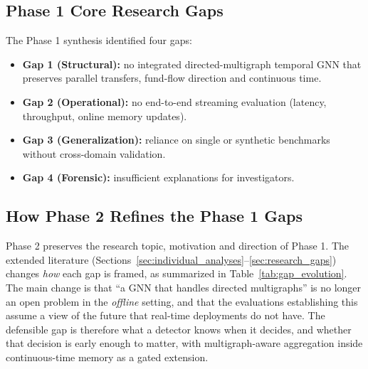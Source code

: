 \documentclass[11pt,a4paper]{article}
\begin{document}
\subsection{Phase 1 Core Research Gaps}
The Phase 1 synthesis identified four gaps:
\begin{itemize}[leftmargin=*]
    \item \textbf{Gap 1 (Structural):} no integrated directed-multigraph temporal GNN that preserves parallel transfers, fund-flow direction and continuous time.
    \item \textbf{Gap 2 (Operational):} no end-to-end streaming evaluation (latency, throughput, online memory updates).
    \item \textbf{Gap 3 (Generalization):} reliance on single or synthetic benchmarks without cross-domain validation.
    \item \textbf{Gap 4 (Forensic):} insufficient explanations for investigators.
\end{itemize}

\subsection{How Phase 2 Refines the Phase 1 Gaps}
Phase 2 preserves the research topic, motivation and direction of Phase 1. The extended literature (Sections~\ref{sec:individual_analyses}--\ref{sec:research_gaps}) changes \emph{how} each gap is framed, as summarized in Table~\ref{tab:gap_evolution}. The main change is that ``a GNN that handles directed multigraphs'' is no longer an open problem in the \emph{offline} setting, and that the evaluations establishing this assume a view of the future that real-time deployments do not have. The defensible gap is therefore what a detector knows when it decides, and whether that decision is early enough to matter, with multigraph-aware aggregation inside continuous-time memory as a gated extension.
\end{document}
